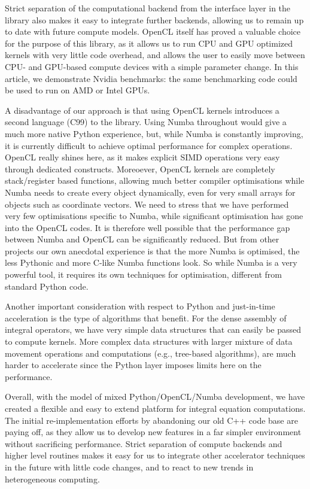 \documentclass{IEEEcsmag}
\begin{document}
Strict separation of the computational backend from the interface layer in the library also makes it easy to integrate further backends, allowing us to remain up to date with future compute models. OpenCL itself has proved a valuable choice for the purpose of this library, as it allows us to run CPU and GPU optimized kernels with very little code overhead, and allows the user to easily move between CPU- and GPU-based compute devices with a simple parameter change. In this article, we demonstrate Nvidia benchmarks: the same benchmarking code could be used to run on AMD or Intel GPUs.

A disadvantage of our approach is that using OpenCL kernels introduces a second language (C99) to the library. Using Numba throughout would give a much more native Python experience, but, while Numba is constantly improving, it is currently difficult to achieve optimal performance for complex operations. OpenCL really shines here, as it makes explicit SIMD operations very easy through dedicated constructs. Moreoever, OpenCL kernels are completely stack/register based functions, allowing much better compiler optimisations while Numba needs to create every object dynamically, even for very small arrays for objects such as coordinate vectors. We need to stress that we have performed very few optimisations specific to Numba, while significant optimisation has gone into the OpenCL codes. It is therefore well possible that the performance gap between Numba and OpenCL can be significantly reduced. But from other projects our own anecdotal experience is that the more Numba is optimised, the less Pythonic and more C-like Numba functions look. So while Numba is a very powerful tool, it requires its own techniques for optimisation, different from standard Python code.

Another important consideration with respect to Python and just-in-time acceleration is the type of algorithms that benefit. For the dense assembly of integral operators, we have very simple data structures that can easily be passed to compute kernels. More complex data structures with larger mixture of data movement operations and computations (e.g., tree-based algorithms), are much harder to accelerate since the Python layer imposes limits here on the performance.

Overall, with the model of mixed Python/OpenCL/Numba development, we have created a flexible and easy to extend platform for integral equation computations. The initial re-implementation efforts by abandoning our old C++ code base are paying off, as they allow us to develop new features in a far simpler environment without sacrificing performance. Strict separation of compute backends and higher level routines makes it easy for us to integrate other accelerator techniques in the future with little code changes, and to react to new trends in heterogeneous computing.
\end{document}
